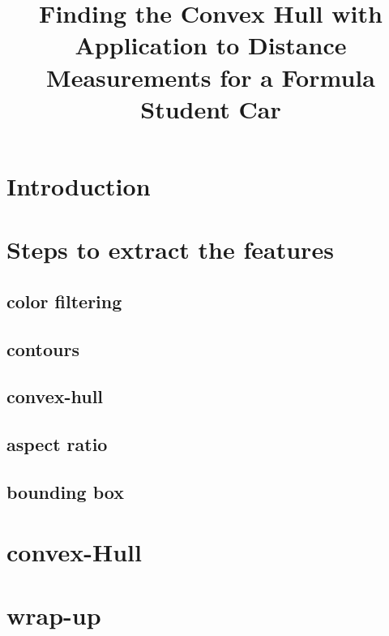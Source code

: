 \documentclass[10pt,a4paper]{article}
\title{Finding the Convex Hull with Application to Distance Measurements for a Formula Student Car}
\begin{document}
	\maketitle
	
	\section{Introduction}
	
	\section{Steps to extract the features}
	\subsection{color filtering}
	\subsection{contours}
	\subsection{convex-hull}
	\subsection{aspect ratio}
	\subsection{bounding box}
	
	\section{convex-Hull}
	
	\section{wrap-up}
	
\end{document}
